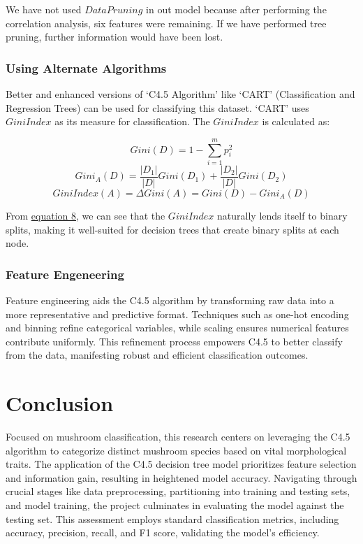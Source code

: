 \documentclass{article}
\begin{document}
\begin{justify}
We have not used $Data Pruning$ in out model because after performing the correlation analysis, six features were remaining. If we have performed tree pruning, further information would have been lost. 

\subsubsection{Using Alternate Algorithms}
Better and enhanced versions of `C4.5 Algorithm' like `CART' (Classification and Regression Trees) can be used for classifying this dataset. `CART' uses $GiniIndex$ as its measure for classification. The $GiniIndex$ is calculated as:

\begin{equation}
    Gini(D) = 1 - \sum_{i=1}^{m}p_i^2
\end{equation}
\begin{equation}\label{equation:1}
    Gini_A(D) = \frac{|D_1|}{|D|}Gini(D_1) + \frac{|D_2|}{|D|}Gini(D_2)
\end{equation}
\begin{equation}
    GiniIndex(A) = \Delta Gini(A) = Gini(D) - Gini_A(D)
\end{equation}

From \hyperref[equation:1]{equation 8}, we can see that the $GiniIndex$ naturally lends itself to binary splits, making it well-suited for decision trees that create binary splits at each node.

\subsubsection{Feature Engeneering}
Feature engineering aids the C4.5 algorithm by transforming raw data into a more representative and predictive format. Techniques such as one-hot encoding and binning refine categorical variables, while scaling ensures numerical features contribute uniformly. This refinement process empowers C4.5 to better classify from the data, manifesting robust and efficient classification outcomes.

\section{Conclusion}\label{sec:conclusion}
Focused on mushroom classification, this research centers on leveraging the C4.5 algorithm to categorize distinct mushroom species based on vital morphological traits. The application of the C4.5 decision tree model prioritizes feature selection and information gain, resulting in heightened model accuracy. Navigating through crucial stages like data preprocessing, partitioning into training and testing sets, and model training, the project culminates in evaluating the model against the testing set. This assessment employs standard classification metrics, including accuracy, precision, recall, and F1 score, validating the model's efficiency.


\end{justify}
\end{document}

